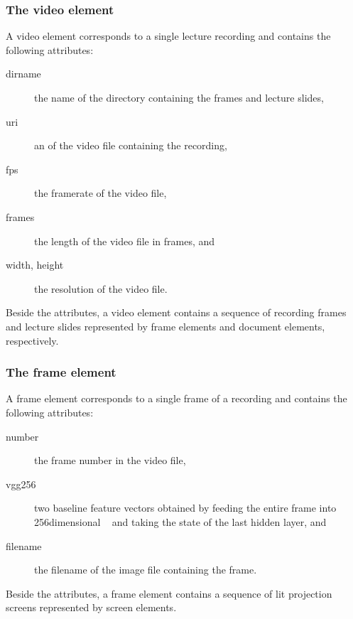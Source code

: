 \subsubsection*{The video element}
A video element corresponds to a single lecture recording and contains the
following attributes:
\begin{description}
  \item[dirname] the name of the directory containing the frames and lecture slides,
  \item[uri] an  of the video file containing the recording,
  \item[fps] the framerate of the video file,
  \item[frames] the length of the video file in frames, and
  \item[width\textmd, height] the resolution of the video file.
\end{description}
Beside the attributes, a video element contains a sequence of recording frames
and lecture slides represented by frame elements and document elements,
respectively.

\subsubsection*{The frame element}
A frame element corresponds to a single frame of a recording and contains the
following attributes:
\begin{description}
  \item[number] the frame number in the video file,
  \item[vgg256] two baseline feature vectors obtained by feeding the entire
    frame into 256dimensional ~\cite{simonyan2014very} and taking the state of the last hidden
    layer, and
  \item[filename] the filename of the image file containing the frame.
\end{description}
Beside the attributes, a frame element contains a sequence of lit projection
screens represented by screen elements.

